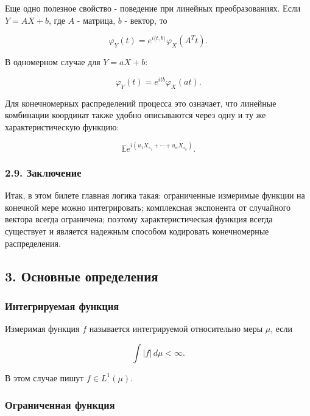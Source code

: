 \documentclass[
  11pt,
  a4paper,
]{article}
\begin{document}
Еще одно полезное свойство - поведение при линейных преобразованиях.
Если \(Y=AX+b\), где \(A\) - матрица, \(b\) - вектор, то

\[
\varphi_Y(t)
=e^{i\langle t,b\rangle}\varphi_X(A^Tt).
\]

В одномерном случае для \(Y=aX+b\):

\[
\varphi_Y(t)=e^{itb}\varphi_X(at).
\]

Для конечномерных распределений процесса это означает, что линейные
комбинации координат также удобно описываются через одну и ту же
характеристическую функцию:

\[
\mathbb E e^{i(u_1X_{s_1}+\cdots+u_nX_{s_n})}.
\]

\subsubsection{2.9.
Заключение}\label{ux437ux430ux43aux43bux44eux447ux435ux43dux438ux435}

Итак, в этом билете главная логика такая: ограниченные измеримые функции
на конечной мере можно интегрировать; комплексная экспонента от
случайного вектора всегда ограничена; поэтому характеристическая функция
всегда существует и является надежным способом кодировать конечномерные
распределения.

\subsection{3. Основные
определения}\label{ux43eux441ux43dux43eux432ux43dux44bux435-ux43eux43fux440ux435ux434ux435ux43bux435ux43dux438ux44f}

\subsubsection{Интегрируемая
функция}\label{ux438ux43dux442ux435ux433ux440ux438ux440ux443ux435ux43cux430ux44f-ux444ux443ux43dux43aux446ux438ux44f}

Измеримая функция \(f\) называется интегрируемой относительно меры
\(\mu\), если

\[
\int |f|\,d\mu<\infty.
\]

В этом случае пишут \(f\in L^1(\mu)\).

\subsubsection{Ограниченная
функция}\label{ux43eux433ux440ux430ux43dux438ux447ux435ux43dux43dux430ux44f-ux444ux443ux43dux43aux446ux438ux44f}
\end{document}
